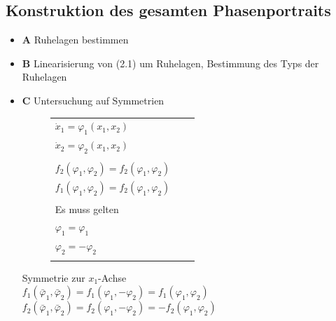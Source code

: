\documentclass[11pt,a4paper]{article}
\begin{document}
\subsection{Konstruktion des gesamten Phasenportraits}
\begin{itemize}
\item{\textbf{A}} Ruhelagen bestimmen
\item{\textbf{B}} Linearisierung von (2.1) um Ruhelagen, Bestimmung des Typs der Ruhelagen
\item{\textbf{C}} Untersuchung auf Symmetrien
\begin{figure}[htbp]
\begin{minipage}[c]{8.0cm}
\def\svgwidth{150pt} 
 
\end{minipage}
\begin{minipage}[c]{7cm}

\begin{tabular}{lll}
$\dot x_1 = \varphi_1(x_1, x_2)$ &&\\
$\dot x_2 = \varphi_2(x_1, x_2)$ &&\\
&&\\
$f_2(\varphi_1, \varphi_2)=f_2(\varphi_1,\varphi_2)$ &&\\
$f_1(\varphi_1, \varphi_2)=f_2(\varphi_1,\varphi_2)$ &&\\
&&\\
Es muss gelten &&\\
$\varphi_1 = \varphi_1$ &&\\
$\varphi_2 = -\varphi_2$ &&\\
&&\\
\end{tabular}
\end{minipage}
\end{figure} 
Symmetrie zur $x_1$-Achse\\
$f_1(\bar \varphi_1, \bar \varphi_2)=f_1(\varphi_1,-\varphi_2)= f_1(\varphi_1,\varphi_2)$\\
$f_2(\bar \varphi_1, \bar \varphi_2)=f_2(\varphi_1,-\varphi_2)= -f_2(\varphi_1,\varphi_2)$\\


\end{itemize}
\end{document}
